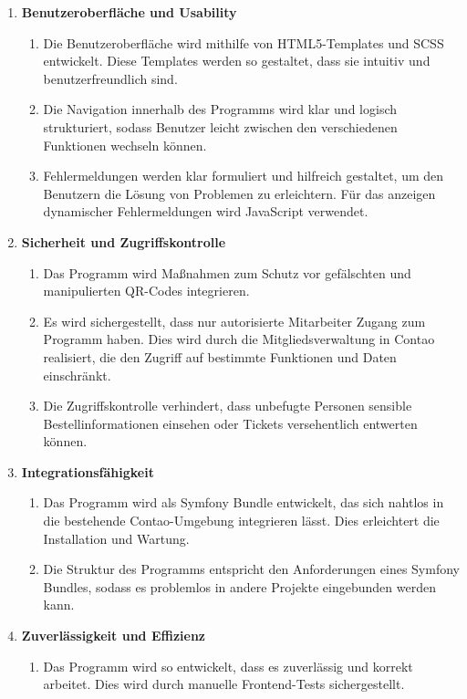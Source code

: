 \begin{enumerate}[itemsep=0em,partopsep=0em,parsep=0em,topsep=0em]
    \item \textbf{Benutzeroberfläche und Usability}
    \begin{enumerate}
        \item Die Benutzeroberfläche wird mithilfe von HTML5-Templates und SCSS entwickelt. Diese Templates werden so gestaltet, dass sie intuitiv und benutzerfreundlich sind.
        \item Die Navigation innerhalb des Programms wird klar und logisch strukturiert, sodass Benutzer leicht zwischen den verschiedenen Funktionen wechseln können.
        \item Fehlermeldungen werden klar formuliert und hilfreich gestaltet, um den Benutzern die Lösung von Problemen zu erleichtern. Für das anzeigen dynamischer Fehlermeldungen wird JavaScript verwendet.
    \end{enumerate}

    \item \textbf{Sicherheit und Zugriffskontrolle}
    \begin{enumerate}
        \item Das Programm wird Maßnahmen zum Schutz vor gefälschten und manipulierten QR-Codes integrieren.
        \item Es wird sichergestellt, dass nur autorisierte Mitarbeiter Zugang zum Programm haben. Dies wird durch die Mitgliedsverwaltung in Contao realisiert, die den Zugriff auf bestimmte Funktionen und Daten einschränkt.
        \item Die Zugriffskontrolle verhindert, dass unbefugte Personen sensible Bestellinformationen einsehen oder Tickets versehentlich entwerten können.
    \end{enumerate}

    \item \textbf{Integrationsfähigkeit}
    \begin{enumerate}
        \item Das Programm wird als Symfony Bundle entwickelt, das sich nahtlos in die bestehende Contao-Umgebung integrieren lässt. Dies erleichtert die Installation und Wartung.
        \item Die Struktur des Programms entspricht den Anforderungen eines Symfony Bundles, sodass es problemlos in andere Projekte eingebunden werden kann.
    \end{enumerate}

    \item \textbf{Zuverlässigkeit und Effizienz}
    \begin{enumerate}
        \item Das Programm wird so entwickelt, dass es zuverlässig und korrekt arbeitet. Dies wird durch manuelle Frontend-Tests sichergestellt.
    \end{enumerate}
\end{enumerate}

